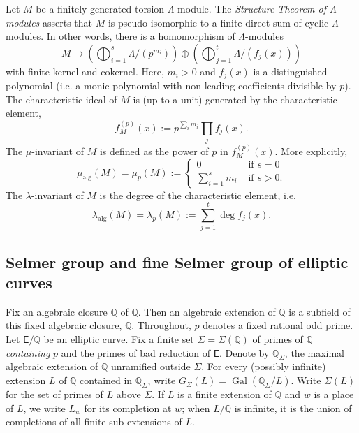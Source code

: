 \documentclass{amsart}
\numberwithin{equation}{section}
\theoremstyle{remark}
\newcommand{\Gal}{\operatorname{Gal}}
\newcommand{\alg}{\operatorname{alg}}
\newcommand{\Q}{\mathbb{Q}}
\newcommand{\EC}{\mathsf{E}}
\theoremstyle{plain} %
\begin{document}
Let $M$ be a finitely generated torsion $\Lambda$-module.
The \emph{Structure Theorem of $\Lambda$-modules} asserts \cite[Theorem~13.12]{Was97} that $M$ is pseudo-isomorphic to a finite direct sum of cyclic $\Lambda$-modules.
In other words, there is a homomorphism of $\Lambda$-modules
\[
M \longrightarrow \left(\bigoplus_{i=1}^s \Lambda/(p^{m_i})\right)\oplus \left(\bigoplus_{j=1}^t \Lambda/(f_j(x)) \right)
\]
with finite kernel and cokernel.
Here, $m_i>0$ and $f_j(x)$ is a distinguished polynomial (i.e. a monic polynomial with non-leading coefficients divisible by $p$).
The characteristic ideal of $M$ is (up to a unit) generated by the characteristic element,
\[
f_{M}^{(p)}(x) := p^{\sum_{i} m_i} \prod_j f_j(x).
\]
The $\mu$-invariant of $M$ is defined as the power of $p$ in $f_{M}^{(p)}(x)$.
More explicitly,
\[
\mu_{\alg}(M) = \mu_p(M):=\begin{cases}0 & \textrm{ if } s=0\\
\sum_{i=1}^s m_i & \textrm{ if } s>0.
\end{cases}
\]
The $\lambda$-invariant of $M$ is the degree of the characteristic element, i.e.
\[
\lambda_{\alg}(M) = \lambda_p(M) := \sum_{j=1}^t \deg f_j(x).
\]


\subsection{Selmer group and fine Selmer group of elliptic curves}
Fix an algebraic closure $\overline{\Q}$ of $\Q$.
Then an algebraic extension of $\Q$ is a subfield of this fixed algebraic closure, $\overline{\Q}$.
Throughout, $p$ denotes a fixed rational odd prime.
Let $\EC/\Q$ be an elliptic curve.
Fix a finite set $\Sigma = \Sigma(\Q)$ of primes of $\Q$ \emph{containing} $p$ and the primes of bad reduction of $\EC$.
Denote by $\Q_{\Sigma}$, the maximal algebraic extension of $\Q$ unramified outside $\Sigma$.
For every (possibly infinite) extension $L$ of $\Q$ contained in $\Q_{\Sigma}$, write $G_{\Sigma}\left({L}\right) = \Gal\left(\Q_{\Sigma}/{L}\right)$.
Write $\Sigma(L)$ for the set of primes of $L$ above $\Sigma$.
If $L$ is a finite extension of $\Q$ and $w$ is a place of $L$, we write $L_w$ for its completion at $w$; when $L/\Q$ is infinite, it is the union of completions of all finite sub-extensions of $L$.
\end{document}
